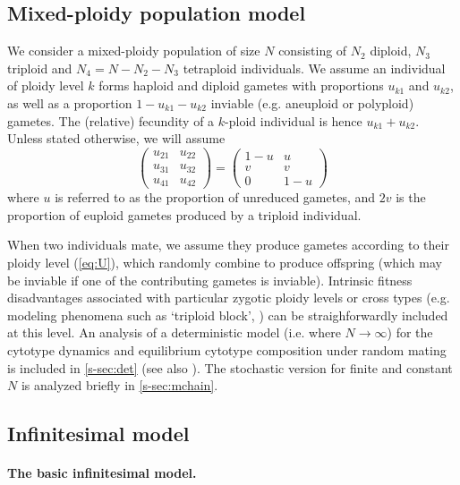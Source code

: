 \documentclass[11pt,a4paper]{article}
\begin{document}
\subsection*{Mixed-ploidy population model}

We consider a mixed-ploidy population of size $N$ consisting of $N_2$ diploid,
$N_3$ triploid and $N_4=N-N_2-N_3$ tetraploid individuals.
We assume an individual of ploidy level $k$ forms haploid and diploid gametes
with proportions $u_{k1}$ and $u_{k2}$, as well as a proportion
$1-u_{k1}-u_{k2}$ inviable (e.g. aneuploid or polyploid) gametes.
The (relative) fecundity of a $k$-ploid individual is hence $u_{k1} + u_{k2}$.
Unless stated otherwise, we will assume 
\begin{equation}
    \begin{pmatrix} 
    u_{21} & u_{22} \\ 
    u_{31} & u_{32} \\ 
    u_{41} & u_{42} 
    \end{pmatrix} =
    \begin{pmatrix} 
    1-u & u \\
    v & v \\
    0 & 1-u
    \end{pmatrix} \label{eq:U}
\end{equation}
where $u$ is referred to as the proportion of unreduced gametes, and $2v$ is
the proportion of euploid gametes produced by a triploid individual.

When two individuals mate, we assume they produce gametes according to their
ploidy level (\cref{eq:U}), which randomly combine to produce offspring (which
may be inviable if one of the contributing gametes is inviable).
Intrinsic fitness disadvantages associated with particular zygotic ploidy
levels or cross types (e.g. modeling phenomena such as `triploid block',
\citep{ramsey1998,brown2024}) can be straighforwardly included at this level.
An analysis of a deterministic model (i.e. where $N \rightarrow \infty$) for
the cytotype dynamics and equilibrium cytotype composition under random mating
is included in \cref{s-sec:det} (see also \cite{felber1997,kauai2024}).
The stochastic version for finite and constant $N$ is analyzed briefly in
\cref{s-sec:mchain}.

\subsection*{Infinitesimal model}

\paragraph*{The basic infinitesimal model.}
\end{document}
